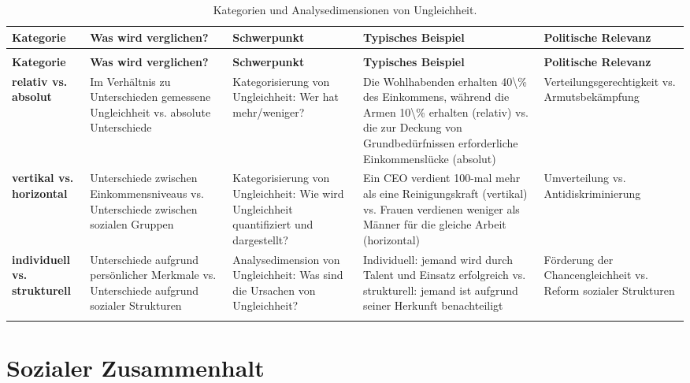\documentclass[
  nswissgerman,
  a4paper,
  DIV=11,
  numbers=noendperiod,
  oneside,
  openany]{scrreprt}
\begin{document}
\begin{longtable}[t]{>{\raggedright\arraybackslash}p{1.6cm}>{\raggedright\arraybackslash}p{2.5cm}>{\raggedright\arraybackslash}p{2.5cm}>{\raggedright\arraybackslash}p{2.5cm}>{\raggedright\arraybackslash}p{2.5cm}}

\caption{\label{tbl-inequality-categories}Kategorien und
Analysedimensionen von Ungleichheit.}

\tabularnewline

\toprule
\textbf{Kategorie} & \textbf{Was wird verglichen?} & \textbf{Schwerpunkt} & \textbf{Typisches Beispiel} & \textbf{Politische Relevanz}\\
\midrule
\endfirsthead
\multicolumn{5}{@{}l}{\textit{(continued)}}\\
\toprule
\textbf{Kategorie} & \textbf{Was wird verglichen?} & \textbf{Schwerpunkt} & \textbf{Typisches Beispiel} & \textbf{Politische Relevanz}\\
\midrule
\endhead

\endfoot
\bottomrule
\endlastfoot
\textbf{relativ vs. absolut} & Im Verhältnis zu Unterschieden gemessene Ungleichheit vs. absolute Unterschiede & Kategorisierung von Ungleichheit: Wer hat mehr/weniger? & Die Wohlhabenden erhalten 40\textbackslash{}\% des Einkommens, während die Armen 10\textbackslash{}\% erhalten (relativ) vs. die zur Deckung von Grundbedürfnissen erforderliche Einkommenslücke (absolut) & Verteilungsgerechtigkeit vs. Armutsbekämpfung\\
\textbf{vertikal vs. horizontal} & Unterschiede zwischen Einkommensniveaus vs. Unterschiede zwischen sozialen Gruppen & Kategorisierung von Ungleichheit: Wie wird Ungleichheit quantifiziert und dargestellt? & Ein CEO verdient 100-mal mehr als eine Reinigungskraft (vertikal) vs. Frauen verdienen weniger als Männer für die gleiche Arbeit (horizontal) & Umverteilung vs. Antidiskriminierung\\
\textbf{individuell vs. strukturell} & Unterschiede aufgrund persönlicher Merkmale vs. Unterschiede aufgrund sozialer Strukturen & Analysedimension von Ungleichheit: Was sind die Ursachen von Ungleichheit? & Individuell: jemand wird durch Talent und Einsatz erfolgreich vs. strukturell: jemand ist aufgrund seiner Herkunft benachteiligt & Förderung der Chancengleichheit vs. Reform sozialer Strukturen\\*

\end{longtable}

\endgroup{}

\section{Sozialer Zusammenhalt}\label{sozialer-zusammenhalt}
\end{document}
